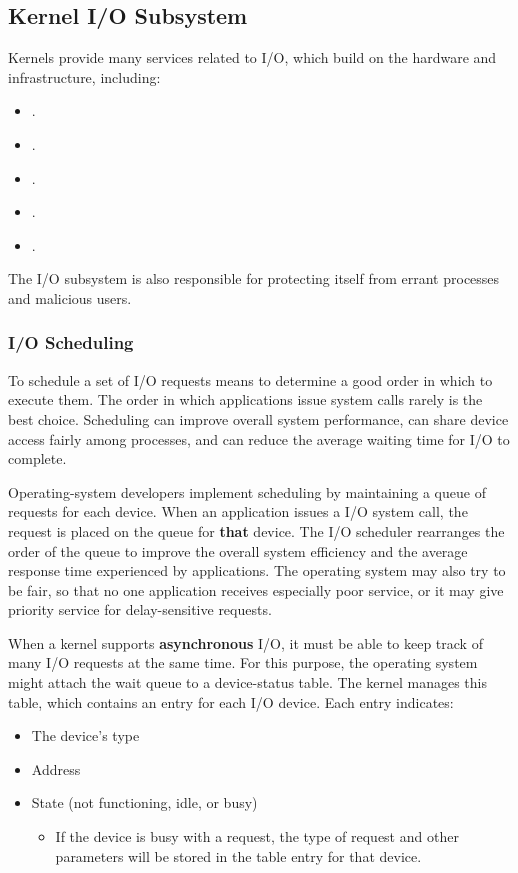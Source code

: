 \subsection{Kernel I/O Subsystem}\label{subsec:Kernel_IO_Subsystem}
Kernels provide many services related to I/O, which build on the hardware and  infrastructure, including:
\begin{itemize}[noitemsep]
\item {}.
\item {}.
\item {}.
\item {}.
\item {}.
\end{itemize}

The I/O subsystem is also responsible for protecting itself from errant processes and malicious users.

\subsubsection{I/O Scheduling}\label{subsubsec:IO_Scheduling}
To schedule a set of I/O requests means to determine a good order in which to execute them.
The order in which applications issue system calls rarely is the best choice.
Scheduling can improve overall system performance, can share device access fairly among processes, and can reduce the average waiting time for I/O to complete.

Operating-system developers implement scheduling by maintaining a queue of requests for each device.
When an application issues a  I/O system call, the request is placed on the queue for \textbf{that} device.
The I/O scheduler rearranges the order of the queue to improve the overall system efficiency and the average response time experienced by applications.
The operating system may also try to be fair, so that no one application receives especially poor service, or it may give priority service for delay-sensitive requests.

When a kernel supports \textbf{asynchronous} I/O, it must be able to keep track of many I/O requests at the same time.
For this purpose, the operating system might attach the wait queue to a device-status table.
The kernel manages this table, which contains an entry for each I/O device.
Each entry indicates:
\begin{itemize}[noitemsep]
\item The device's type
\item Address
\item State (not functioning, idle, or busy)
  \begin{itemize}[noitemsep]
  \item If the device is busy with a request, the type of request and other parameters will be stored in the table entry for that device.
  \end{itemize}
\end{itemize}

